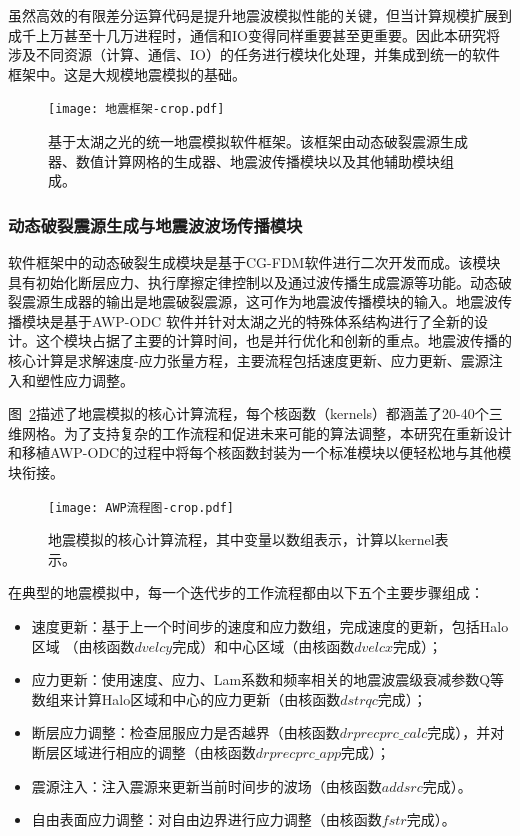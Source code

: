虽然高效的有限差分运算代码是提升地震波模拟性能的关键，但当计算规模扩展到成千上万甚至十几万进程时，通信和IO变得同样重要甚至更重要。因此本研究将涉及不同资源（计算、通信、IO）的任务进行模块化处理，并集成到统一的软件框架中。这是大规模地震模拟的基础。

\begin{figure}[ht]
\centering
\texttt{[image: 地震框架-crop.pdf]}
\caption{基于太湖之光的统一地震模拟软件框架。该框架由动态破裂震源生成器、数值计算网格的生成器、地震波传播模块以及其他辅助模块组成。}
\label{fig:framework}
\end{figure}

\subsubsection{动态破裂震源生成与地震波波场传播模块}

软件框架中的动态破裂生成模块是基于CG-FDM软件\citep{zhang2014three}进行二次开发而成。该模块具有初始化断层应力、执行摩擦定律控制以及通过波传播生成震源等功能。动态破裂震源生成器的输出是地震破裂震源，这可作为地震波传播模块的输入。地震波传播模块是基于AWP-ODC \citep {cui2010scalable}软件并针对太湖之光的特殊体系结构进行了全新的设计。这个模块占据了主要的计算时间，也是并行优化和创新的重点。地震波传播的核心计算是求解速度-应力张量方程，主要流程包括速度更新、应力更新、震源注入和塑性应力调整。

图~\ref{fig:awp-workflow}描述了地震模拟的核心计算流程，每个核函数（kernels）都涵盖了20-40个三维网格。为了支持复杂的工作流程和促进未来可能的算法调整，本研究在重新设计和移植AWP-ODC的过程中将每个核函数封装为一个标准模块以便轻松地与其他模块衔接。

\begin{figure}[ht]
\centering
\texttt{[image: AWP流程图-crop.pdf]}
\caption{地震模拟的核心计算流程，其中变量以数组表示，计算以kernel表示。}
\label{fig:awp-workflow}
\end{figure}

在典型的地震模拟中，每一个迭代步的工作流程都由以下五个主要步骤组成：

\begin{itemize}
\item 速度更新：基于上一个时间步的速度和应力数组，完成速度的更新，包括Halo区域 （由核函数$dvelcy$完成）和中心区域（由核函数$dvelcx$完成）；

\item 应力更新：使用速度、应力、Lam系数和频率相关的地震波震级衰减参数Q等数组来计算Halo区域和中心的应力更新（由核函数$dstrqc$完成）；

\item 断层应力调整：检查屈服应力是否越界（由核函数$drprecprc\_calc$完成），并对断层区域进行相应的调整（由核函数$drprecprc\_app$完成）；

\item 震源注入：注入震源来更新当前时间步的波场（由核函数$addsrc$完成）。

\item 自由表面应力调整：对自由边界进行应力调整（由核函数$fstr$完成）。
\end{itemize}

